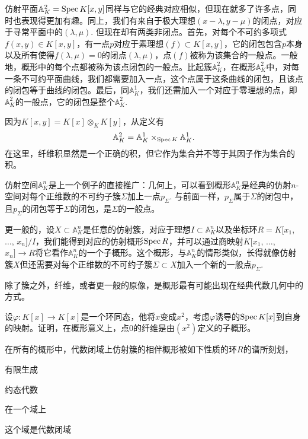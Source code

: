 仿射平面$\mathbb{A}^2_K=\operatorname{Spec} K[x,y]$同样与它的经典对应相似，但现在就多了许多点，同时也表现得更加有趣。同上，我们有来自于极大理想$(x-\lambda,y-\mu)$的闭点，对应于寻常平面中的$(\lambda,\mu)$. 但现在却有两类非闭点。首先，对每个不可约多项式$f(x,y)\in K[x,y]$，有一点$p$对应于素理想$(f)\subset K[x,y]$，它的闭包包含$p$本身以及所有使得$f(\lambda,\mu)=0$的闭点$(\lambda,\mu)$，点$(f)$被称为该集合的一般点。一般地，概形中的每个点都被称为该点闭包的一般点。比起簇$\mathbb{A}^2_K$，在概形$\mathbb{A}^2_K$中，对每一条不可约平面曲线，我们都需要加入一点，这个点属于这条曲线的闭包，且该点的闭包等于曲线的闭包。最后，同$\mathbb{A}^1_K$，我们还需加入一个对应于零理想的点，即$\mathbb{A}^2_K$的一般点，它的闭包是整个$\mathbb{A}^2_K$.


因为$K[x,y]=K[x]\otimes_K K[y]$，从定义有
\[
	\mathbb{A}^2_K=\mathbb{A}^1_K\times_{\operatorname{Spec} K}\mathbb{A}^1_K.
\]
在这里，纤维积显然是一个正确的积，但它作为集合并不等于其因子作为集合的积。

仿射空间$\mathbb{A}^n_K$是上一个例子的直接推广：几何上，可以看到概形$\mathbb{A}^n_K$是经典的仿射$n$-空间对每个正维数的不可约子簇$\Sigma$加上一点$p_\Sigma$. 与前面一样，$p_\Sigma$属于$\Sigma$的闭包中，且$p_\Sigma$的闭包等于$\Sigma$的闭包，是$\Sigma$的一般点。

更一般的，设$X\subset \mathbb{A}^n_K$是任意的仿射簇，对应于理想$I\subset \mathbb{A}^n_K$以及坐标环$R=K[x_1$, $\dots$, $x_n]/I$，我们能得到对应的仿射概形$\operatorname{Spec} R$，并可以通过商映射$K[x_1$, $\dots$, $x_n]\to R$将它看作$\mathbb{A}^n_K$的一个子概形。这个概形，与$\mathbb{A}^n_K$的情形类似，长得就像仿射簇$X$但还需要对每个正维数的不可约子簇$\Sigma\subset X$加入一个新的一般点$p_\Sigma$.

除了簇之外，纤维，或者更一般的原像，是概形最有可能出现在经典代数几何中的方式。

\begin{exe} \label{exe:2.2}
设$\varphi:K[x]\to K[x]$是一个环同态，他将$x$变成$x^2$，考虑$\varphi$诱导的$\operatorname{Spec} K[x]$到自身的映射。证明，在概形意义上，点$0$的纤维是由$(x^2)$定义的子概形。
\end{exe}

在所有的概形中，代数闭域上仿射簇的相伴概形被如下性质的环$R$的谱所刻划，
\begin{compactitem}[~~~--]
\item 有限生成
\item 约态代数
\item 在一个域上
\item 这个域是代数闭域
\end{compactitem}

